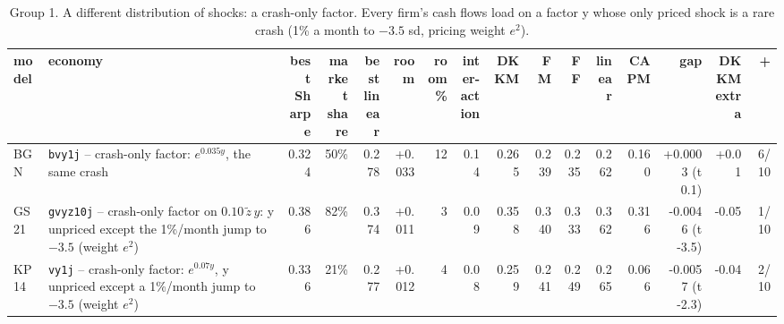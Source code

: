 \begin{table}[htbp]\centering\footnotesize\setlength{\tabcolsep}{2pt}
\caption{Group 1. A different distribution of shocks: a crash-only factor. Every firm's cash flows load on a factor y whose only priced shock is a rare crash (1\% a month to $-3.5$ sd, pricing weight $e^2$).}\label{tab:g1}
\begin{adjustbox}{max width=\textwidth}\begin{tabular}{l>{\raggedright\arraybackslash}p{3.6cm}rrrrrrrrrrrrrr}\hline
model & economy & \shortstack[r]{best\\Sharpe} & \shortstack[r]{market\\share} & \shortstack[r]{best\\linear} & room & \shortstack[r]{room\\\%} & \shortstack[r]{inter-\\action} & DKKM & FM & FF & linear & CAPM & gap & \shortstack[r]{DKKM\\extra} & + \\\hline
BGN & \texttt{bvy1j} -- crash-only factor: $e^{0.035y}$, the same crash & 0.324 & 50\% & 0.278 & +0.033 & 12 & 0.14 & 0.265 & 0.239 & 0.235 & 0.262 & 0.160 & +0.0003 (t 0.1) & +0.01 & 6/10 \\
GS21 & \texttt{gvyz10j} -- crash-only factor on $0.10\,\tilde z\,y$: y unpriced except the 1\%/month jump to $-3.5$ (weight $e^2$) & 0.386 & 82\% & 0.374 & +0.011 & 3 & 0.09 & 0.358 & 0.340 & 0.333 & 0.362 & 0.316 & -0.0046 (t -3.5) & -0.05 & 1/10 \\
KP14 & \texttt{vy1j} -- crash-only factor: $e^{0.07y}$, y unpriced except a 1\%/month jump to $-3.5$ (weight $e^2$) & 0.336 & 21\% & 0.277 & +0.012 & 4 & 0.08 & 0.259 & 0.241 & 0.249 & 0.265 & 0.066 & -0.0057 (t -2.3) & -0.04 & 2/10 \\
\hline\end{tabular}\end{adjustbox}\end{table}
